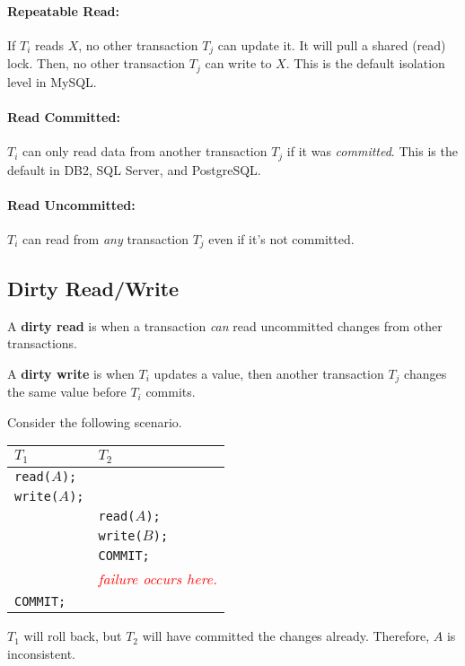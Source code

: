 \documentclass{report}
\newenvironment{definition}[1]{\begin{tcolorbox}[title={Definition: #1}]}{\end{tcolorbox}}
\newenvironment{example}{\begin{tcolorbox}[title={Example},colback=green!5!white,colframe=black!75!green]}{\end{tcolorbox}}
\renewcommand{\bf}[1]{\textbf{{#1}}}
\renewcommand{\tt}[1]{\texttt{{#1}}}
\renewcommand{\it}[1]{\textit{{#1}}}
\begin{document}
\paragraph{Repeatable Read:} If $T_i$ reads $X$, no other transaction $T_j$ can
update it. It will pull a shared (read) lock. Then, no other transaction $T_j$
can write to $X$. This is the default isolation level in MySQL.

\paragraph{Read Committed:} $T_i$ can only read data from another transaction
$T_j$ if it was \it{committed}. This is the default in DB2, SQL Server, and
PostgreSQL.

\paragraph{Read Uncommitted:} $T_i$ can read from \it{any} transaction $T_j$
even if it's not committed.

\subsection{Dirty Read/Write}
\begin{definition}{Dirty Read and Write}
    A \bf{dirty read} is when a transaction \it{can} read uncommitted changes
    from other transactions.
    \vspace{1em}

    A \bf{dirty write} is when $T_i$ updates a value, then another transaction
    $T_j$ changes the same value before $T_i$ commits.
\end{definition}

\begin{example}
    Consider the following scenario.

    {
        \centering
        \begin{tabular}{l|l}
            $T_1$ & $T_2$ \\
            \hline
            \tt{read($A$);} & \\
            \tt{write($A$);} & \\
                             & \tt{read($A$);} \\
                             & \tt{write($B$);} \\
                             & \tt{COMMIT;} \\
                             & \it{\textcolor{red}{failure occurs here.}} \\
            \tt{COMMIT;} & \\
        \end{tabular}
        \par
    }
    $T_1$ will roll back, but $T_2$ will have committed the changes already.
    Therefore, $A$ is inconsistent.
\end{example}
\end{document}
